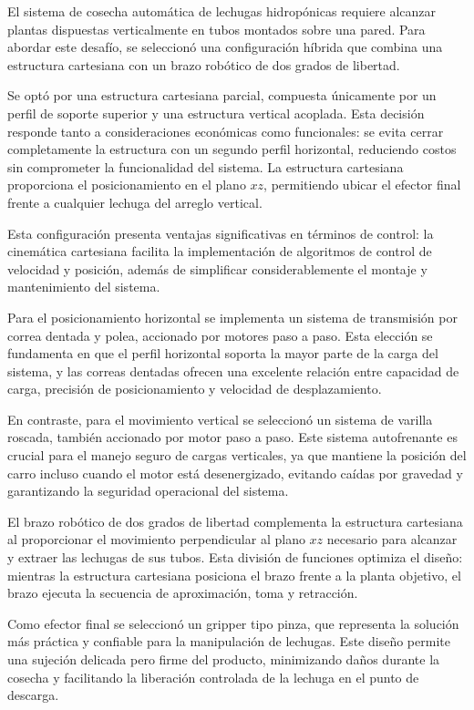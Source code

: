 El sistema de cosecha automática de lechugas hidropónicas requiere alcanzar plantas dispuestas verticalmente en tubos montados sobre una pared. Para abordar este desafío, se seleccionó una configuración híbrida que combina una estructura cartesiana con un brazo robótico de dos grados de libertad.

Se optó por una estructura cartesiana parcial, compuesta únicamente por un perfil de soporte superior y una estructura vertical acoplada. Esta decisión responde tanto a consideraciones económicas como funcionales: se evita cerrar completamente la estructura con un segundo perfil horizontal, reduciendo costos sin comprometer la funcionalidad del sistema. La estructura cartesiana proporciona el posicionamiento en el plano $xz$, permitiendo ubicar el efector final frente a cualquier lechuga del arreglo vertical.

Esta configuración presenta ventajas significativas en términos de control: la cinemática cartesiana facilita la implementación de algoritmos de control de velocidad y posición, además de simplificar considerablemente el montaje y mantenimiento del sistema.

Para el posicionamiento horizontal se implementa un sistema de transmisión por correa dentada y polea, accionado por motores paso a paso. Esta elección se fundamenta en que el perfil horizontal soporta la mayor parte de la carga del sistema, y las correas dentadas ofrecen una excelente relación entre capacidad de carga, precisión de posicionamiento y velocidad de desplazamiento.

En contraste, para el movimiento vertical se seleccionó un sistema de varilla roscada, también accionado por motor paso a paso. Este sistema autofrenante es crucial para el manejo seguro de cargas verticales, ya que mantiene la posición del carro incluso cuando el motor está desenergizado, evitando caídas por gravedad y garantizando la seguridad operacional del sistema.

El brazo robótico de dos grados de libertad complementa la estructura cartesiana al proporcionar el movimiento perpendicular al plano $xz$ necesario para alcanzar y extraer las lechugas de sus tubos. Esta división de funciones optimiza el diseño: mientras la estructura cartesiana posiciona el brazo frente a la planta objetivo, el brazo ejecuta la secuencia de aproximación, toma y retracción.

Como efector final se seleccionó un gripper tipo pinza, que representa la solución más práctica y confiable para la manipulación de lechugas. Este diseño permite una sujeción delicada pero firme del producto, minimizando daños durante la cosecha y facilitando la liberación controlada de la lechuga en el punto de descarga.
